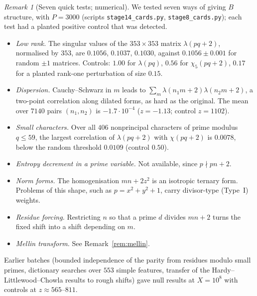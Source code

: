 \documentclass[11pt]{amsart}
\theoremstyle{definition}
\theoremstyle{remark}
\newtheorem{remark}[theorem]{Remark}
\begin{document}
\begin{remark}[Seven quick tests; numerical]\label{rem:cards}
We tested seven ways of giving $B$ structure, with $P=3000$ (scripts \texttt{stage14\_cards.py}, \texttt{stage8\_cards.py}); each test had a planted positive control that was detected.
\begin{itemize}
\item \emph{Low rank.} The singular values of the $353\times353$ matrix $\lambda(pq+2)$, normalised by $353$, are $0.1056$, $0.1037$, $0.1030$, against $0.1056\pm0.001$ for random $\pm1$ matrices. Controls: $1.00$ for $\lambda(pq)$, $0.56$ for $\chi_5(pq+2)$, $0.17$ for a planted rank-one perturbation of size $0.15$.
\item \emph{Dispersion.} Cauchy--Schwarz in $m$ leads to $\sum_m\lambda(n_1m+2)\lambda(n_2m+2)$, a two-point correlation along dilated forms, as hard as the original. The mean over $7140$ pairs $(n_1,n_2)$ is $-1.7\cdot10^{-4}$ ($z=-1.13$; control $z=1102$).
\item \emph{Small characters.} Over all $406$ nonprincipal characters of prime modulus $q\le59$, the largest correlation of $\lambda(pq+2)$ with $\chi(pq+2)$ is $0.0078$, below the random threshold $0.0109$ (control $0.50$).
\item \emph{Entropy decrement in a prime variable.} Not available, since $p\nmid pn+2$.
\item \emph{Norm forms.} The homogenisation $mn+2z^2$ is an isotropic ternary form. Problems of this shape, such as $p=x^2+y^2+1$, carry divisor-type (Type~I) weights.
\item \emph{Residue forcing.} Restricting $n$ so that a prime $d$ divides $mn+2$ turns the fixed shift into a shift depending on $m$.
\item \emph{Mellin transform.} See Remark~\ref{rem:mellin}.
\end{itemize}
Earlier batches (bounded independence of the parity from residues modulo small primes, dictionary searches over $553$ simple features, transfer of the Hardy--Littlewood--Chowla results \cite{LWW26} to rough shifts) gave null results at $X=10^8$ with controls at $z\approx565$--$811$.
\end{remark}
\end{document}
